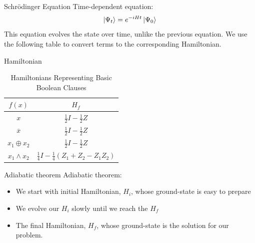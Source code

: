 \documentclass[14pt, aspectratio=169]{beamer}
\begin{document}
\begin{frame}{Schrödinger Equation}
    Time-dependent equation:
    \[\ket{\Psi_{t}} = e^{-iHt}\ket{\Psi_{0}}\]
    This equation evolves the state over time, unlike the previous equation.
    We use the following table to convert terms to the corresponding Hamiltonian.
\end{frame}


\begin{frame}{Hamiltonian}
    \begin{table}[ht]
        \label{tab:Table1}
        \centering
        \begin{tabular}{||c | c ||}
            \hline
            \(f(x)\)               & \(H_f\)                                            \\[2mm]
            \hline
            \hline
            \({x}\)                & $\frac{1}{2}I - \frac{1}{2}Z$                      \\[2mm] \hline\(\overline{x}\)& $\frac{1}{2}I - \frac{1}{2}Z$\\[2mm]
            \hline
            \({x}_1 \oplus {x}_2\) & $\frac{1}{2}I - \frac{1}{2}Z$                      \\[2mm]
            \hline
            \({x}_1 \land{x}_2\)   & \(\frac{1}{4}I - \frac{1}{4}(Z_1 + Z_2 - Z_1Z_2)\) \\[2mm] \hline
        \end{tabular}
        \caption{Hamiltonians Representing Basic Boolean Clauses}
    \end{table}
\end{frame}

\begin{frame}{Adiabatic theorem}
    Adiabatic theorem:
    \begin{itemize}
        \item We start with initial Hamiltonian, {\color{blue} $H_{i}$}, whose ground-state
              is easy to prepare
        \item We evolve our {\color{blue} $H_{i}$} slowly until we reach the {\color{blue}
                      $H_{f}$}
        \item The final Hamiltonian, {\color{blue} $H_{f}$}, whose ground-state is the
              solution for our problem.
    \end{itemize}
\end{frame}
\end{document}
